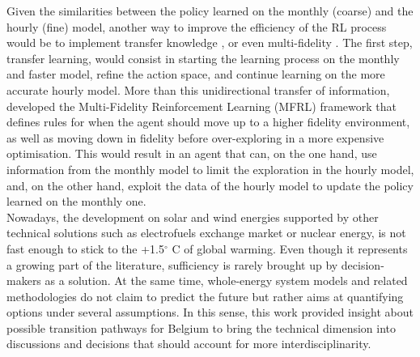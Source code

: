 Given the similarities between the policy learned on the monthly (coarse) and the hourly (fine) model, another way to improve the efficiency of the \gls{RL} process would be to implement transfer knowledge \cite{mann2013directed}, or even multi-fidelity \cite{cutler2014reinforcement}.  The first step, transfer learning, would consist in starting the learning process on the monthly and faster model, refine the action space, and continue learning on the more accurate hourly model.  More than this unidirectional transfer of information, \citet{cutler2014reinforcement} developed the Multi-Fidelity Reinforcement Learning (MFRL) framework that defines rules for when the agent should move up to a higher fidelity environment, as well as moving down in fidelity before over-exploring in a more expensive optimisation.  This would result in an agent that can, on the one hand, use information from the monthly model to limit the exploration in the hourly model, and, on the other hand, exploit the data of the hourly model to update the policy learned on the monthly one.\\

Nowadays, the development on solar and wind energies supported by other technical solutions such as electrofuels exchange market or nuclear energy, is not fast enough to stick to the +1.5$^{\circ}$ C of global warming. Even though it represents a growing part of the literature, sufficiency is rarely brought up by decision-makers as a solution. At the same time, whole-energy system models and related methodologies do not claim to predict the future but rather aims at quantifying options under several assumptions. In this sense, this work provided insight about possible transition pathways for Belgium to bring the technical dimension into discussions and decisions that should account for more interdisciplinarity.
